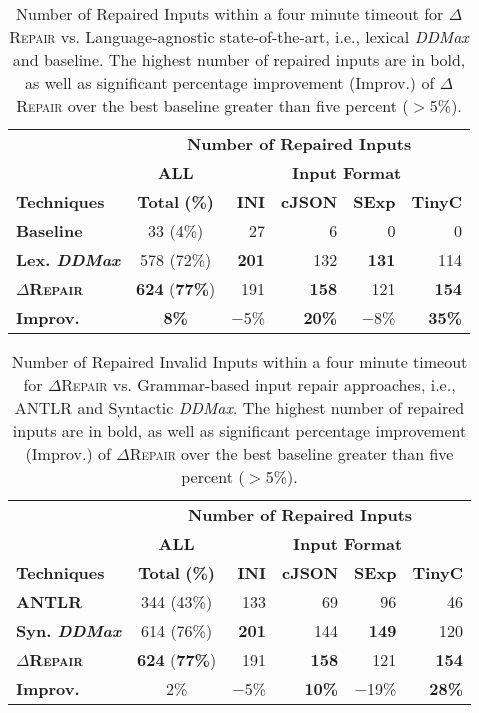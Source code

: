 \documentclass[acmsmall,screen,review,anonymous]{acmart}
\newcommand{\approach}{\textsc{$\Delta$Repair}\xspace}
\newcommand{\ddmax}{\textit{DDMax}\xspace}
\begin{document}
\begin{table}[!tbp]\centering
\caption{Number of Repaired Inputs within a four minute timeout for \approach vs. Language-agnostic state-of-the-art, i.e., lexical \ddmax and  baseline. The highest number of repaired inputs are in bold, as well as significant percentage improvement (Improv.) of \approach over the best baseline greater than five percent ($>$5\%). }
\begin{tabular}{|l | c | r  r  r  r |}
\hline
&  \multicolumn{5}{c|}{\textbf{Number of Repaired Inputs}}  \\
&  \multicolumn{1}{c|}{\textbf{ALL}} & \multicolumn{4}{c|}{\textbf{Input Format}}  \\
\textbf{Techniques} & \textbf{Total} \textbf{(\%)} & \textbf{INI} & \textbf{cJSON} & \textbf{SExp} & \textbf{TinyC} \\
\hline
\textbf{Baseline}   & 33 (4\%) & 27	 & 6 &	0	& 0\\
\textbf{Lex. \ddmax} & 578 (72\%) & \textbf{201}  & 132  & \textbf{131} & 114  \\ 		
\hline	
\textbf{\approach}  & \textbf{624} (\textbf{77\%}) & 191 & \textbf{158}  & 121  & \textbf{154} \\
\hline
\textbf{Improv.} &  \textbf{8\%}  & $-$5\% & \textbf{20\%} & $-$8\% & \textbf{35\%} \\
\hline
\end{tabular}
\label{tab:effectiveness-no-grammar}
\end{table}


\begin{table}[!tbp]\centering
\caption{Number of Repaired Invalid Inputs within a four minute timeout for \approach vs. Grammar-based input repair approaches, i.e.,  ANTLR and Syntactic \ddmax. The highest number of repaired inputs are in bold, as well as significant percentage improvement (Improv.) of \approach over the best baseline greater than five percent ($>$5\%). }
\begin{tabular}{|l | c | r  r  r  r |}
\hline
&  \multicolumn{5}{c|}{\textbf{Number of Repaired Inputs}}  \\
&  \multicolumn{1}{c|}{\textbf{ALL}} & \multicolumn{4}{c|}{\textbf{Input Format}}  \\
\textbf{Techniques} & \textbf{Total} \textbf{(\%)} & \textbf{INI} & \textbf{cJSON} & \textbf{SExp} & \textbf{TinyC} \\
\hline
\textbf{ANTLR} & 344 (43\%) & 133 & 69 & 96 &  46   \\
\textbf{Syn. \ddmax} & 614 (76\%) & \textbf{201}  & 144  & \textbf{149}  & 120  \\ 	
\hline
\textbf{\approach}  & \textbf{624} (\textbf{77\%}) & 191 & \textbf{158}  & 121  &  \textbf{154} \\
\hline
\textbf{Improv.} &  2\%  & $-$5\% & \textbf{10\%} & $-$19\% & \textbf{28\%} \\
\hline
\end{tabular}
\label{tab:effectiveness-grammar}
\end{table}
\end{document}
